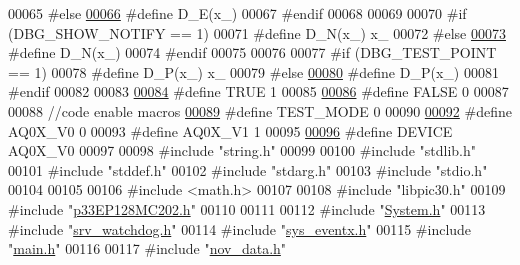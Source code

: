 \begin{DoxyCode}
00065 \textcolor{preprocessor}{#else}
\hypertarget{a00040_source_l00066}{}\hyperlink{a00040_ae8251f649f2077b9d0de5a10e6c2cf79}{00066} \textcolor{preprocessor}{#define D\_E(x\_)}
00067 \textcolor{preprocessor}{#endif}
00068 
00069 
00070 \textcolor{preprocessor}{#if (DBG\_SHOW\_NOTIFY == 1)}
00071 \textcolor{preprocessor}{#define D\_N(x\_) x\_}
00072 \textcolor{preprocessor}{#else}
\hypertarget{a00040_source_l00073}{}\hyperlink{a00040_afdf6a05ce2b9711e8bb4ef40fdb6930a}{00073} \textcolor{preprocessor}{#define D\_N(x\_)}
00074 \textcolor{preprocessor}{#endif}
00075 
00076 
00077 \textcolor{preprocessor}{#if (DBG\_TEST\_POINT == 1)}
00078 \textcolor{preprocessor}{#define D\_P(x\_) x\_}
00079 \textcolor{preprocessor}{#else}
\hypertarget{a00040_source_l00080}{}\hyperlink{a00040_aaa56ed691cef86e8de0c4e90e47f2e5d}{00080} \textcolor{preprocessor}{#define D\_P(x\_)}
00081 \textcolor{preprocessor}{#endif}
00082 
00083 
\hypertarget{a00040_source_l00084}{}\hyperlink{a00040_aa8cecfc5c5c054d2875c03e77b7be15d}{00084} \textcolor{preprocessor}{#define TRUE    1}
00085 
\hypertarget{a00040_source_l00086}{}\hyperlink{a00040_aa93f0eb578d23995850d61f7d61c55c1}{00086} \textcolor{preprocessor}{#define FALSE   0}
00087 
00088 \textcolor{comment}{//code enable macros}
\hypertarget{a00040_source_l00089}{}\hyperlink{a00040_ab6d58cce6e97b6b549801e696ac9f4f6}{00089} \textcolor{preprocessor}{#define  TEST\_MODE  0}
00090 
\hypertarget{a00040_source_l00092}{}\hyperlink{a00040_ad750d25410f340cb93a424349ccecdd3}{00092} \textcolor{preprocessor}{#define  AQ0X\_V0      0}
00093 \textcolor{preprocessor}{#define  AQ0X\_V1      1}
00095 
\hypertarget{a00040_source_l00096}{}\hyperlink{a00040_a775d096fbc3988fb7ed858b79ef44e22}{00096} \textcolor{preprocessor}{#define  DEVICE      AQ0X\_V0}
00097 
00098 \textcolor{preprocessor}{#include "string.h"}
00099 
00100 \textcolor{preprocessor}{#include "stdlib.h"}
00101 \textcolor{preprocessor}{#include "stddef.h"}
00102 \textcolor{preprocessor}{#include "stdarg.h"}
00103 \textcolor{preprocessor}{#include "stdio.h"}
00104 
00105 
00106 \textcolor{preprocessor}{#include <math.h>}
00107 
00108 \textcolor{preprocessor}{#include "libpic30.h"}
00109 \textcolor{preprocessor}{#include "\hyperlink{a00015}{p33EP128MC202.h}"}
00110 
00111 
00112 \textcolor{preprocessor}{#include "\hyperlink{a00072}{System.h}"}
00113 \textcolor{preprocessor}{#include "\hyperlink{a00067}{srv\_watchdog.h}"}
00114 \textcolor{preprocessor}{#include "\hyperlink{a00036}{sys\_eventx.h}"}
00115 \textcolor{preprocessor}{#include "\hyperlink{a00033}{main.h}"}
00116 
00117 \textcolor{preprocessor}{#include "\hyperlink{a00022}{nov\_data.h}"}

\end{DoxyCode}
